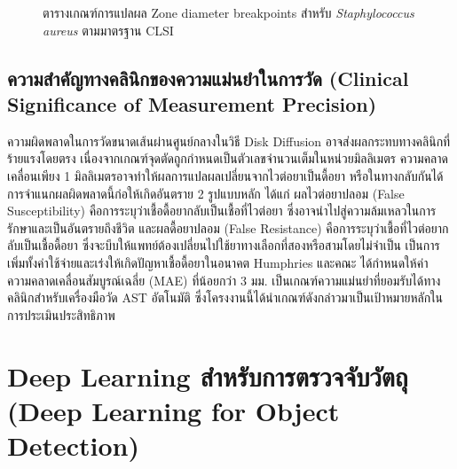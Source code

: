 \begin{figure}[H]
  \centering
  \caption{ตารางเกณฑ์การแปลผล Zone diameter breakpoints สำหรับ \textit{Staphylococcus aureus} ตามมาตรฐาน CLSI \cite{clsi2025}}
  \label{fig:clsi_table}
\end{figure}

\subsection{ความสำคัญทางคลินิกของความแม่นยำในการวัด (Clinical Significance of Measurement Precision)}

ความผิดพลาดในการวัดขนาดเส้นผ่านศูนย์กลางในวิธี Disk Diffusion อาจส่งผลกระทบทางคลินิกที่ร้ายแรงโดยตรง เนื่องจากเกณฑ์จุดตัดถูกกำหนดเป็นตัวเลขจำนวนเต็มในหน่วยมิลลิเมตร ความคลาดเคลื่อนเพียง 1 มิลลิเมตรอาจทำให้ผลการแปลผลเปลี่ยนจากไวต่อยาเป็นดื้อยา หรือในทางกลับกันได้ การจำแนกผลผิดพลาดนี้ก่อให้เกิดอันตราย 2 รูปแบบหลัก ได้แก่ ผลไวต่อยาปลอม (False Susceptibility) คือการระบุว่าเชื้อดื้อยากลับเป็นเชื้อที่ไวต่อยา ซึ่งอาจนำไปสู่ความล้มเหลวในการรักษาและเป็นอันตรายถึงชีวิต และผลดื้อยาปลอม (False Resistance) คือการระบุว่าเชื้อที่ไวต่อยากลับเป็นเชื้อดื้อยา ซึ่งจะบีบให้แพทย์ต้องเปลี่ยนไปใช้ยาทางเลือกที่สองหรือสามโดยไม่จำเป็น เป็นการเพิ่มทั้งค่าใช้จ่ายและเร่งให้เกิดปัญหาเชื้อดื้อยาในอนาคต Humphries และคณะ \cite{humphries2018} ได้กำหนดให้ค่าความคลาดเคลื่อนสัมบูรณ์เฉลี่ย (MAE) ที่น้อยกว่า 3 มม. เป็นเกณฑ์ความแม่นยำที่ยอมรับได้ทางคลินิกสำหรับเครื่องมือวัด AST อัตโนมัติ ซึ่งโครงงานนี้ได้นำเกณฑ์ดังกล่าวมาเป็นเป้าหมายหลักในการประเมินประสิทธิภาพ

\section{Deep Learning สำหรับการตรวจจับวัตถุ (Deep Learning for Object Detection)}

